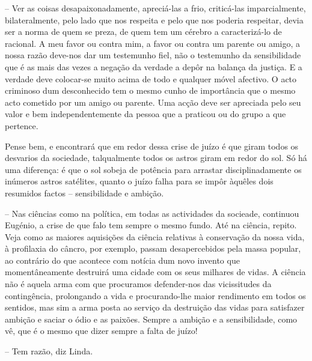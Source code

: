 \documentclass[9pt]{article}
\begin{document}
-- Ver as coisas desapaixonadamente, apreciá-las a frio, criticá-las imparcialmente, bilateralmente, pelo lado que nos respeita e pelo que nos poderia respeitar, devia ser a norma de quem se preza, de
quem tem um cérebro a caracterizá-lo de racional. A meu favor ou
contra mim, a favor ou contra um parente ou amigo, a nossa razão deve-nos dar um testemunho fiel, não o testemunho da sensibilidade que é
as mais das vezes a nega\-ção da verdade a depôr na balan\-ça da justiça.
E a verdade deve colocar-se muito acima de todo e qualquer móvel
afectivo. O acto criminoso dum desconhecido tem o mesmo cunho de importância que o mesmo acto cometido por um amigo ou parente. Uma ac\-ção
deve ser apreciada pelo seu valor e bem independentemente da pessoa
que a praticou ou do grupo a que pertence.

Pense bem, e encontrará que em redor dessa crise de juízo é que
giram todos os desvarios da sociedade, talqualmente todos os astros
giram em redor do sol. Só há uma diferença: é que o sol sobeja de potência para arrastar disciplinadamente os inúmeros astros satélites, quanto o juízo
fa\-lha para se impôr à\-quê\-les dois resumidos factos -- sensibilidade
e ambi\-ção.

-- Nas ciências como na política, em todas as actividades da socieade, continuou Eugé\-nio, a crise de que falo tem sempre o mesmo fundo.
Até na ciência, repito. Veja como as maiores aquisi\-ções da ciência relativas à conserva\-ção da nossa vida, à profilaxia do câncro, por exemplo,
passam desapercebidos pela massa popular, ao contrário do que acontece
com notícia dum novo invento que momentâneamente destruirá uma cidade com os seus mi\-lhares de vidas. A ciência não é aquela arma com
que procuramos defender-nos das vicissitudes da contingência, prolongando a vida e procurando-\-lhe maior rendimento em todos os sentidos,
mas sim a arma posta ao serviço da destrui\-ção das vidas para satisfazer ambi\-ção e saciar o ódio e as paixões. Sempre a ambi\-ção e a sensibilidade, como vê, que é o mesmo que dizer sempre a falta de juízo!

-- Tem razão, diz Linda.
\end{document}
